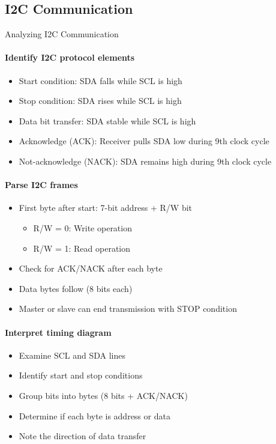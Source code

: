 \subsection{I2C Communication}

\begin{KR}{Analyzing I2C Communication}\\
\paragraph{Identify I2C protocol elements}
\begin{itemize}
    \item Start condition: SDA falls while SCL is high
    \item Stop condition: SDA rises while SCL is high
    \item Data bit transfer: SDA stable while SCL is high
    \item Acknowledge (ACK): Receiver pulls SDA low during 9th clock cycle
    \item Not-acknowledge (NACK): SDA remains high during 9th clock cycle
\end{itemize}

\paragraph{Parse I2C frames}
\begin{itemize}
    \item First byte after start: 7-bit address + R/W bit
    \begin{itemize}
        \item R/W = 0: Write operation
        \item R/W = 1: Read operation
    \end{itemize}
    \item Check for ACK/NACK after each byte
    \item Data bytes follow (8 bits each)
    \item Master or slave can end transmission with STOP condition
\end{itemize}

\paragraph{Interpret timing diagram}
\begin{itemize}
    \item Examine SCL and SDA lines
    \item Identify start and stop conditions
    \item Group bits into bytes (8 bits + ACK/NACK)
    \item Determine if each byte is address or data
    \item Note the direction of data transfer
\end{itemize}
\end{KR}

